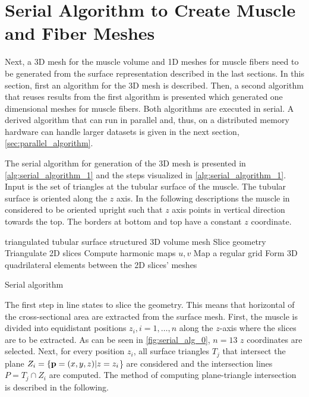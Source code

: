 \section{Serial Algorithm to Create Muscle and Fiber Meshes}\label{sec:ser_alg_meshes}
Next, a 3D mesh for the muscle volume and 1D meshes for muscle fibers need to be generated from the surface representation described in the last sections. In this section, first an algorithm for the 3D mesh is described. Then, a second algorithm that reuses results from the first algorithm is presented which generated one dimensional meshes for muscle fibers. Both algorithms are executed in serial. A derived algorithm that can run in parallel and, thus, on a distributed memory hardware can handle larger datasets is given in the next section, \cref{sec:parallel_algorithm}.

The serial algorithm for generation of the 3D mesh is presented in \cref{alg:serial_algorithm_1} and the steps visualized in \cref{alg:serial_algorithm_1}. Input is the set of triangles at the tubular surface of the muscle. The tubular surface is oriented along the $z$ axis. In the following descriptions the muscle in considered to be oriented upright such that $z$ axis points in vertical direction towards the top. The borders at bottom and top have a constant $z$ coordinate.
%
\begin{algorithm}
  \begin{algorithmic}[1]%
    \Require triangulated tubular surface
    \Ensure structured 3D volume mesh
    \Statex
    \State Slice geometry       \label{alg:1.1}
    \State Triangulate 2D slices
    \State Compute harmonic maps $u, v$
    \State Map a regular grid
    \State Form 3D quadrilateral elements between the 2D slices’ meshes
    \EndProcedure
  \end{algorithmic}%
  \caption{Serial algorithm}%
  \label{alg:serial_algorithm_1}%
\end{algorithm}%

The first step in line  states to slice the geometry. This means that horizontal  of the cross-sectional area are extracted from the surface mesh. First, the muscle is divided into equidistant positions $z_i, i=1,\dots,n$ along the $z$-axis where the slices are to be extracted. As can be seen in \cref{fig:serial_alg_0}, $n=13$ $z$ coordinates are selected. Next, for every position $z_i$, all surface triangles $T_j$ that intersect the plane $Z_i = \{\textbf{p}=(x,y,z) | z=z_i$\} are considered and the intersection lines $P = T_j \cap Z_i$ are computed. The method of computing plane-triangle intersection is described in the following.

